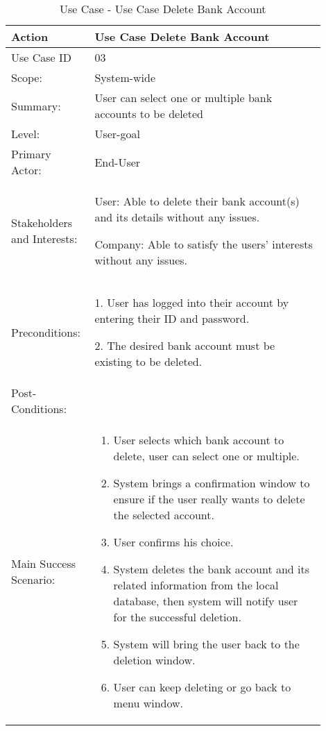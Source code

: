 \documentclass{article}
\newcounter{use case ID}
\newcommand\tabularhead[1]{
\begin{table}[ht]
    \addtocounter{use case ID}{1}
    \caption{Use Case \arabic{use case ID} - #1}
    \vspace{0.2cm}
    \begin{tabular}{|p{0.2\linewidth}|p{0.70\linewidth}|}
    \hline
        \textbf{Action} & \textbf{#1} \\
        \hline}
\newcommand\addrow[2]{#1 & #2\\ \hline}
\newcommand\addmulrow[2]{ \begin{minipage}[t][][t]{2.5cm}#1\end{minipage}
        &\begin{minipage}[t][][t]{11cm}
        \begin{enumerate}[itemsep=-1ex] #2   \end{enumerate}
    \end{minipage}\vfill\\ \hline}
\newenvironment{usecase}{\tabularhead}
{\hline\end{tabular}\end{table}}
\begin{document}
\begin{usecase}{Use Case Delete Bank Account}

\addrow{Use Case ID}{03}
\addrow{Scope:}{System-wide}

\addrow{Summary:}{User can select one or multiple bank accounts to be deleted}

\addrow{Level:}{User-goal}

\addrow{Primary Actor:}{End-User}

\addrow{Stakeholders and Interests:}{
	\item User: Able to delete their bank account(s) and its details without any issues.
	\item Company: Able to satisfy the users' interests without any issues.
}

\addrow{Preconditions:}{
    \item [1.]User has logged into their account by entering their ID and password.
    \item [2.]The desired bank account must be existing to be deleted.
} 

\addrow{Post-Conditions:}{}


\addmulrow{Main Success Scenario:}{
	\item User selects which bank account to delete, user can select one or multiple.
	\item System brings a confirmation window to ensure if the user really wants to delete the selected account.
	\item User confirms his choice.
	\item System deletes the bank account and its related information from the local database, then system will notify user for the successful deletion.
	\item System will bring the user back to the deletion window.
	\item User can keep deleting or go back to menu window.
}


\end{usecase}
\end{document}
